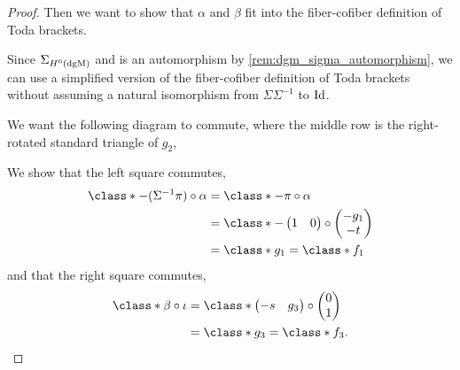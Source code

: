 \begin{proof}
    Then we want to show that \( \alpha \) and \( \beta \) fit into the fiber-cofiber definition of Toda brackets.

    Since \( \Sigma_{H^0(\operatorname{dgM})} \) and is an automorphism by \autoref{rem:dgm_sigma_automorphism}, we can use a simplified version of the fiber-cofiber definition of Toda brackets without assuming a natural isomorphism from \( \Sigma \Sigma^{-1} \) to \( \operatorname{Id} \).

    We want the following diagram to commute, where the middle row is the right-rotated standard triangle of \( g_2 \),
    \begin{center}
    \end{center}

    We show that the left square commutes,
    \begin{align*}
        \class*{- (\Sigma^{-1} \pi) \circ \alpha} &= \class*{- \pi \circ \alpha} \\
        &=
        \class*{
            -
            \begin{pmatrix}
                1 & 0
            \end{pmatrix}
            \circ
            \begin{pmatrix}
                - g_1 \\
                - t
            \end{pmatrix} 
        } \\
        &= \class*{g_1} = \class*{f_1}
    \end{align*}
    and that the right square commutes,
    \begin{align*}
        \class*{\beta \circ \iota} &=
        \class*{
            \begin{pmatrix}
                - s & g_3
            \end{pmatrix}
            \circ
            \begin{pmatrix}
                0 \\
                1
            \end{pmatrix}
         } \\
        &= \class*{g_3} = \class*{f_3}.
    \end{align*}


\end{proof}
